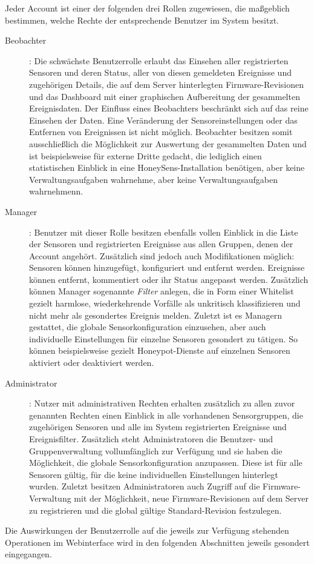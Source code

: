 \documentclass[12pt]{article}
\begin{document}
Jeder Account ist einer der folgenden drei Rollen zugewiesen, die maßgeblich bestimmen, welche Rechte der entsprechende Benutzer im System besitzt.
\begin{description}
				\item[Beobachter]: Die schwächste Benutzerrolle erlaubt das Einsehen aller registrierten Sensoren und deren Status, aller von diesen gemeldeten Ereignisse und zugehörigen Details, die auf dem Server hinterlegten Firmware-Revisionen und das Dashboard mit einer graphischen Aufbereitung der gesammelten Ereignisdaten. Der Einfluss eines Beobachters beschränkt sich auf das reine Einsehen der Daten. Eine Veränderung der Sensoreinstellungen oder das Entfernen von Ereignissen ist nicht möglich. Beobachter besitzen somit ausschließlich die Möglichkeit zur Auswertung der gesammelten Daten und ist beispielsweise für externe Dritte gedacht, die lediglich einen statistischen Einblick in eine HoneySens-Installation benötigen, aber keine Verwaltungsaufgaben wahrnehme, aber keine Verwaltungsaufgaben wahrnehmenn.
				\item[Manager]: Benutzer mit dieser Rolle besitzen ebenfalls vollen Einblick in die Liste der Sensoren und registrierten Ereignisse aus allen Gruppen, denen der Account angehört. Zusätzlich sind jedoch auch Modifikationen möglich: Sensoren können hinzugefügt, konfiguriert und entfernt werden. Ereignisse können entfernt, kommentiert oder ihr Status angepasst werden. Zusätzlich können Manager sogenannte \textit{Filter} anlegen, die in Form einer Whitelist gezielt harmlose, wiederkehrende Vorfälle als unkritisch klassifizieren und nicht mehr als gesondertes Ereignis melden. Zuletzt ist es Managern gestattet, die globale Sensorkonfiguration einzusehen, aber auch individuelle Einstellungen für einzelne Sensoren gesondert zu tätigen. So können beispielsweise gezielt Honeypot-Dienste auf einzelnen Sensoren aktiviert oder deaktiviert werden.
				\item[Administrator]: Nutzer mit administrativen Rechten erhalten zusätzlich zu allen zuvor genannten Rechten einen Einblick in alle vorhandenen Sensorgruppen, die zugehörigen Sensoren und alle im System registrierten Ereignisse und Ereignisfilter. Zusätzlich steht Administratoren die Benutzer- und Gruppenverwaltung vollumfänglich zur Verfügung und sie haben die Möglichkeit, die globale Sensorkonfiguration anzupassen. Diese ist für alle Sensoren gültig, für die keine individuellen Einstellungen hinterlegt wurden. Zuletzt besitzen Administratoren auch Zugriff auf die Firmware-Verwaltung mit der Möglichkeit, neue Firmware-Revisionen auf dem Server zu registrieren und die global gültige Standard-Revision festzulegen.
\end{description}
Die Auswirkungen der Benutzerrolle auf die jeweils zur Verfügung stehenden Operationen im Webinterface wird in den folgenden Abschnitten jeweils gesondert eingegangen.
\end{document}
